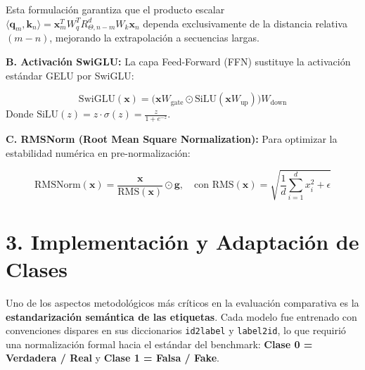Esta formulación garantiza que el producto escalar $\langle \mathbf{q}_m, \mathbf{k}_n \rangle = \mathbf{x}_m^T W_q^T R_{\Theta, n-m}^d W_k \mathbf{x}_n$ dependa exclusivamente de la distancia relativa $(m - n)$, mejorando la extrapolación a secuencias largas.

\vspace{0.5cm}

\textbf{B. Activación SwiGLU:} La capa Feed-Forward (FFN) sustituye la activación estándar GELU por SwiGLU:

\begin{equation}
\text{SwiGLU}(\mathbf{x}) = \Big( \mathbf{x} W_{\text{gate}} \odot \text{SiLU}(\mathbf{x} W_{\text{up}}) \Big) W_{\text{down}}
\end{equation}
Donde $\text{SiLU}(z) = z \cdot \sigma(z) = \frac{z}{1 + e^{-z}}$.

\textbf{C. RMSNorm (Root Mean Square Normalization):} Para optimizar la estabilidad numérica en pre-normalización:

\begin{equation}
\text{RMSNorm}(\mathbf{x}) = \frac{\mathbf{x}}{\text{RMS}(\mathbf{x})} \odot \mathbf{g}, \quad \text{con } \text{RMS}(\mathbf{x}) = \sqrt{\frac{1}{d} \sum_{i=1}^d x_i^2 + \epsilon}
\end{equation}


\section*{3. Implementación y Adaptación de Clases}

Uno de los aspectos metodológicos más críticos en la evaluación comparativa es la \textbf{estandarización semántica de las etiquetas}. Cada modelo fue entrenado con convenciones dispares en sus diccionarios \texttt{id2label} y \texttt{label2id}, lo que requirió una normalización formal hacia el estándar del benchmark: \textbf{Clase 0 = Verdadera / Real} y \textbf{Clase 1 = Falsa / Fake}.

\begin{table}[H]
\centering
\caption{Adaptación y Mapeo de Etiquetas de cada Modelo}
\label{tab:mapeo_etiquetas}
\end{table}

